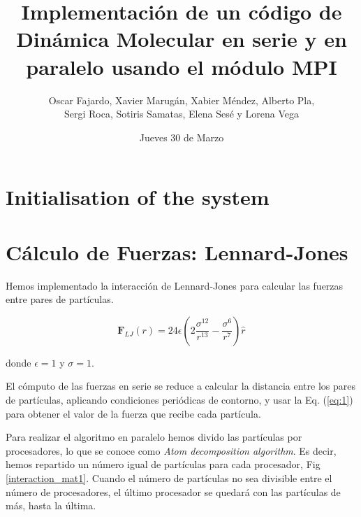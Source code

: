 \documentclass[onecolumn]{article}
\renewcommand{\vec}[1]{\mathbf{#1}}
\begin{document}
\pagestyle{fancy}


\title{Implementación de un código de Dinámica Molecular en serie y en paralelo usando el módulo MPI}
\author{Oscar Fajardo, Xavier Marugán, Xabier Méndez, Alberto Pla,\\ Sergi Roca, Sotiris Samatas, Elena Sesé y Lorena Vega}
\date{Jueves 30 de Marzo}

\maketitle

\section{Initialisation of the system}


\section{Cálculo de Fuerzas: Lennard-Jones}
Hemos implementado la interacción de Lennard-Jones para calcular las fuerzas entre pares de partículas.

\begin{equation} \label{eq:1}
 \vec{F}_{LJ} (r) = 24 \epsilon  \left(2 \frac{{\sigma}^{12}}{r^{13}} -  \frac{{\sigma}^{6}}{r^{7}}\right)\hat{r}
\end{equation}

donde $\epsilon = 1$ y $\sigma = 1$.


El cómputo de las fuerzas en serie se reduce a calcular la distancia entre los pares de partículas, aplicando condiciones periódicas de contorno, y usar la Eq. (\ref{eq:1}) para obtener el valor de la fuerza que recibe cada partícula. 

Para realizar el algoritmo en paralelo hemos divido las partículas por procesadores, lo que se conoce como \textit{Atom decomposition algorithm}. Es decir, hemos repartido un número igual de partículas para cada procesador, Fig \ref{interaction_mat1}. Cuando el número de partículas no sea divisible entre el número de procesadores, el último procesador se quedará con las partículas de más, hasta la última. 
\end{document}
